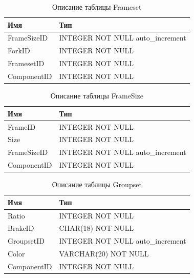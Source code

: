 \documentclass[a4paper,14pt]{extarticle}
\begin{document}

\begin{table}[h!] 
 \centering
	\caption{Описание таблицы Frameset}
	\begin{tabular}{|l|l|}
  \hline \textbf{Имя} & \textbf{Тип} \\
		\hline
		FrameSizeID &   INTEGER NOT NULL auto\_increment \\ \hline
		ForkID &        INTEGER NOT NULL \\ \hline
		FramesetID &    INTEGER NOT NULL \\ \hline
		ComponentID &   INTEGER NOT NULL \\ \hline
	\end{tabular}
	\label{tab:frameset}
\end{table}



\begin{table}[h!] 
 \centering
	\caption{Описание таблицы FrameSize}
	\begin{tabular}{|l|l|}
  \hline \textbf{Имя} & \textbf{Тип} \\
		\hline
		FrameID &       INTEGER NOT NULL \\ \hline
		Size &  INTEGER NOT NULL \\ \hline
		FrameSizeID &   INTEGER NOT NULL auto\_increment \\ \hline
		ComponentID &   INTEGER NOT NULL \\ \hline
	\end{tabular}
	\label{tab:framesize}
\end{table}



\begin{table}[h!] 
 \centering
	\caption{Описание таблицы Groupset}
	\begin{tabular}{|l|l|}
  \hline \textbf{Имя} & \textbf{Тип} \\
		\hline
		Ratio & INTEGER NOT NULL \\ \hline
		BrakeID &       CHAR(18) NOT NULL \\ \hline
		GroupsetID &    INTEGER NOT NULL auto\_increment \\ \hline
		Color & VARCHAR(20) NOT NULL \\ \hline
		ComponentID &   INTEGER NOT NULL \\ \hline
	\end{tabular}
	\label{tab:groupset}
\end{table}
\end{document}
